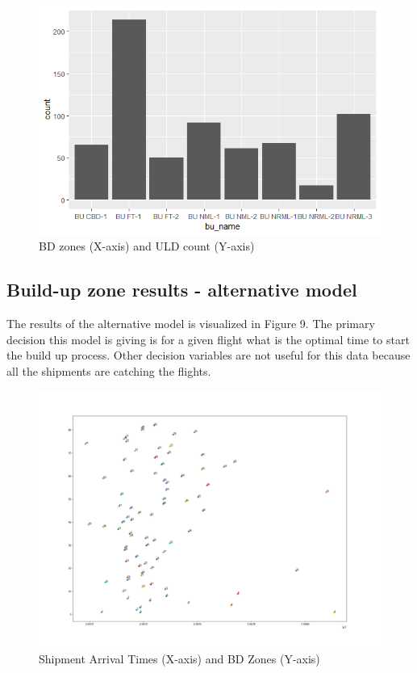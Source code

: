 \documentclass[11pt,a4paper,fleqn]{article}
\begin{document}
	\begin{figure}[hbt!]
		\centering
		\includegraphics[width=150mm,scale=1.0]{Rplot_bu.png}
		\caption{BD zones (X-axis) and ULD count (Y-axis)}
		\label{fig:BD zones (X-axis) and ULD count (Y-axis)}
	\end{figure}
	
	\pagebreak
	\subsection{Build-up zone results - alternative model}
	\label{sec:fmBDResults}
	The results of the alternative model is visualized in Figure 9. The primary decision this model is giving is for a given flight what is the optimal time to start the build up process. Other decision variables are not useful for this data because all the shipments are catching the flights.
	
	\begin{figure}[hbt!]
		\centering
		\includegraphics[width=130mm,scale=1]{al_model_2.png}
		\caption{Shipment Arrival Times (X-axis) and BD Zones (Y-axis)}
		\label{fig:Shipment Arrival Times (X-axis) and BD Zones (Y-axis)}
	\end{figure}
	
\end{document}
